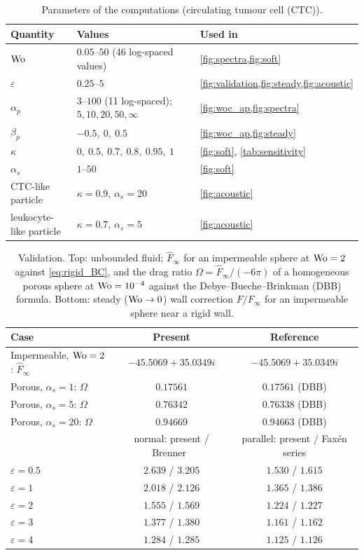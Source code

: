\begin{table}[t]
\caption{Parameters of the computations (circulating tumour cell (CTC)).}
\label{tab:params}
\begin{ruledtabular}
\begin{tabular}{lll}
Quantity & Values & Used in\\
\hline
$\mathrm{Wo}$ & $0.05$--$50$ (46 log-spaced values) & \cref{fig:spectra,fig:soft}\\
$\varepsilon$ & $0.25$--$5$ & \cref{fig:validation,fig:steady,fig:acoustic}\\
$\alpha_p$ & $3$--$100$ (11 log-spaced); $5,10,20,50,\infty$ & \cref{fig:woc_ap,fig:spectra}\\
$\beta_p$ & $-0.5,\ 0,\ 0.5$ & \cref{fig:woc_ap,fig:steady}\\
$\kappa$ & $0,\ 0.5,\ 0.7,\ 0.8,\ 0.95,\ 1$ & \cref{fig:soft}, \cref{tab:sensitivity}\\
$\alpha_s$ & $1$--$50$ & \cref{fig:soft}\\
CTC-like particle & $\kappa=0.9$, $\alpha_s=20$ & \cref{fig:acoustic}\\
leukocyte-like particle & $\kappa=0.7$, $\alpha_s=5$ & \cref{fig:acoustic}\\
\end{tabular}
\end{ruledtabular}
\end{table}

\begin{table}[t]
\caption{Validation. Top: unbounded fluid; $\hat F_\infty$ for an impermeable sphere at $\mathrm{Wo}=2$ against
\cref{eq:rigid_BC}, and the drag ratio $\Omega=\hat F_\infty/(-6\pi)$ of a homogeneous porous sphere at $\mathrm{Wo}=10^{-4}$
against the Debye--Bueche--Brinkman (DBB) formula. Bottom: steady ($\mathrm{Wo}\to0$) wall correction $F/F_\infty$ for an
impermeable sphere near a rigid wall.}
\label{tab:validation}
\begin{ruledtabular}
\begin{tabular}{lcc}
Case & Present & Reference\\
\hline
Impermeable, $\mathrm{Wo}=2$: $\hat F_\infty$ & $-45.5069+35.0349i$ & $-45.5069+35.0349i$\\
Porous, $\alpha_s=1$: $\Omega$ & $0.17561$ & $0.17561$ (DBB)\\
Porous, $\alpha_s=5$: $\Omega$ & $0.76342$ & $0.76338$ (DBB)\\
Porous, $\alpha_s=20$: $\Omega$ & $0.94669$ & $0.94663$ (DBB)\\
\hline
 & normal: present / Brenner~\cite{brenner1961slow} & parallel: present / Faxén series\\
$\varepsilon=0.5$ & $2.639$ / $3.205$ & $1.530$ / $1.615$\\
$\varepsilon=1$ & $2.018$ / $2.126$ & $1.365$ / $1.386$\\
$\varepsilon=2$ & $1.555$ / $1.569$ & $1.224$ / $1.227$\\
$\varepsilon=3$ & $1.377$ / $1.380$ & $1.161$ / $1.162$\\
$\varepsilon=4$ & $1.284$ / $1.285$ & $1.125$ / $1.126$\\
\end{tabular}
\end{ruledtabular}
\end{table}

